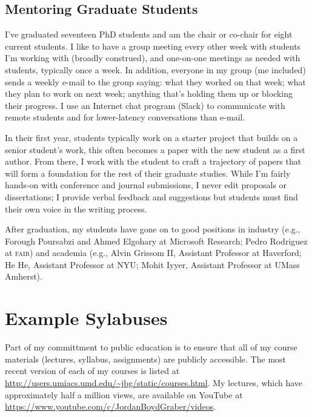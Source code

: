 \documentclass[11pt]{amsart}
\newcommand{\abr}[1]{\textsc{#1}}
\begin{document}
\subsection{Mentoring Graduate Students}

I've graduated seventeen PhD students and am the chair or co-chair for
eight current students.  I like to have a group meeting every other
week with students I'm working with (broadly construed), and
one-on-one meetings as needed with students, typically once a week. In
addition, everyone in my group (me included) sends a weekly e-mail to
the group saying: what they worked on that week; what they plan to work
on next week; anything that's holding them up or blocking their
progress. I use an Internet chat program (Slack) to communicate with remote
students and for lower-latency conversations than e-mail.

In their first year, students typically work on a starter project that
builds on a senior student's work, this often becomes a paper with the
new student as a first author.  From there, I work with the student to
craft a trajectory of papers that will form a foundation for the rest
of their graduate studies.  While I'm fairly hands-on with conference
and journal submissions, I never edit proposals or dissertations; I
provide verbal feedback and suggestions but students must find their
own voice in the writing process.

After graduation, my students have gone on to good positions in
industry (e.g., Forough Poursabzi and Ahmed Elgohary at Microsoft
Research; Pedro Rodriguez at \abr{fair}) and academia (e.g., Alvin
Grissom II, Assistant Professor at Haverford; He He, Assistant
Professor at NYU; Mohit Iyyer, Assistant Professor at UMass Amherst).

\section{Example Sylabuses}

Part of my committment to public education is to ensure that all of my course
materials (lectures, syllabus, assignments) are publicly accessible. The most
recent version of each of my courses is listed at
\url{http://users.umiacs.umd.edu/~jbg/static/courses.html}.  My lectures, which have approximately half a million views, are available on YouTube at \url{https://www.youtube.com/c/JordanBoydGraber/videos}.

\end{document}
